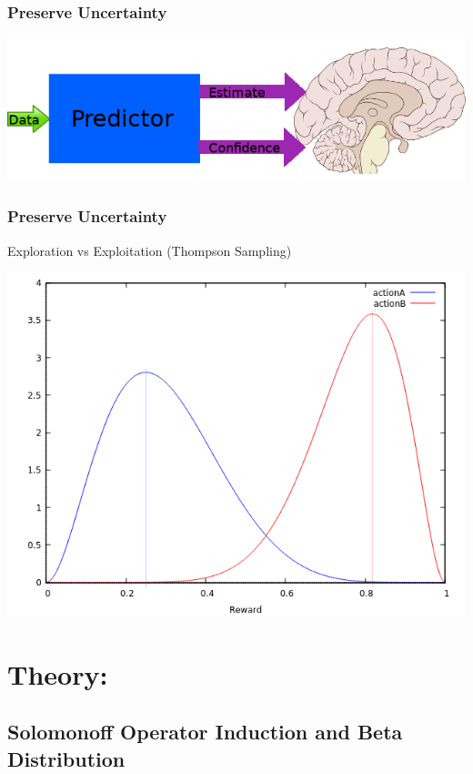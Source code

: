 \documentclass{beamer}
\begin{document}
\begin{frame}[fragile]
  \frametitle{Preserve Uncertainty}

  \includegraphics[scale=0.5]{images/preserve_uncertainty.png}
\end{frame}

\begin{frame}[fragile]
  \frametitle{Preserve Uncertainty}

  Exploration vs Exploitation (Thompson Sampling)

  \begin{center}
    \includegraphics[scale=0.55]{images/ActionA_ActionB_lines_alpha.png}
  \end{center}
\end{frame}

\section{Theory:}
\subsection{Solomonoff Operator Induction and Beta Distribution}
\end{document}
